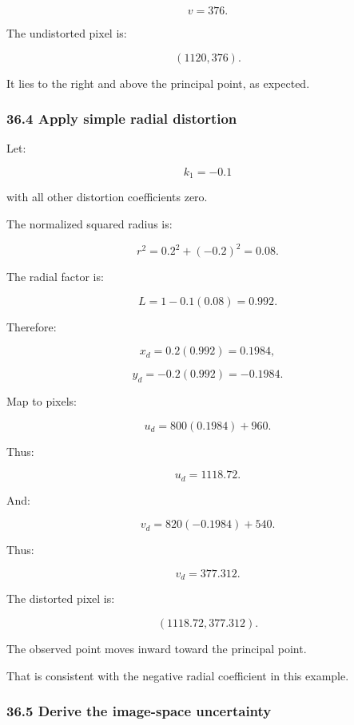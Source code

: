 \[
 \boxed{v=376}.
\]

The undistorted pixel is:

\[
 \boxed{(1120,376)}.
\]

It lies to the right and above the principal point, as expected.

\subsubsection{36.4 Apply simple radial distortion}\label{02-foundations-ii-ch037-apply-simple-radial-distortion}

\hypertarget{02-foundations-ii-ch037-apply-simple-radial-distortion}{}

Let:

\[
 k_1=-0.1
\]

with all other distortion coefficients zero.

The normalized squared radius is:

\[
 r^2=0.2^2+(-0.2)^2=0.08.
\]

The radial factor is:

\[
 L=1-0.1(0.08)=0.992.
\]

Therefore:

\[
 x_d=0.2(0.992)=0.1984,
\]

\[
 y_d=-0.2(0.992)=-0.1984.
\]

Map to pixels:

\[
 u_d=800(0.1984)+960.
\]

Thus:

\[
 \boxed{u_d=1118.72}.
\]

And:

\[
 v_d=820(-0.1984)+540.
\]

Thus:

\[
 \boxed{v_d=377.312}.
\]

The distorted pixel is:

\[
 \boxed{(1118.72,377.312)}.
\]

The observed point moves inward toward the principal point.

That is consistent with the negative radial coefficient in this example.

\subsubsection{36.5 Derive the image-space uncertainty}\label{02-foundations-ii-ch037-derive-the-image-space-uncertainty}

\hypertarget{02-foundations-ii-ch037-derive-the-image-space-uncertainty}{}


